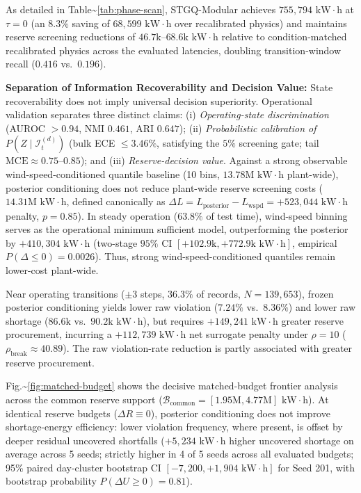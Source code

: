 \documentclass[
  journal]{IEEEtran}
\begin{document}
As detailed in Table\textasciitilde{}\ref{tab:phase-scan}, STGQ-Modular
achieves \(755{,}794\text{ kW}\cdot\text{h}\) at \(\tau=0\) (an
\(8.3\%\) saving of \(68{,}599\text{ kW}\cdot\text{h}\) over
recalibrated physics) and maintains reserve screening reductions of
\(46.7\text{k}\text{--}68.6\text{k}\text{ kW}\cdot\text{h}\) relative to
condition-matched recalibrated physics across the evaluated latencies,
doubling transition-window recall (\(0.416\) vs.~\(0.196\)).

\textbf{Separation of Information Recoverability and Decision Value:}
State recoverability does not imply universal decision superiority.
Operational validation separates three distinct claims: (i)
\textit{Operating-state discrimination} (AUROC \(> 0.94\), NMI
\(0.461\), ARI \(0.647\)); (ii)
\textit{Probabilistic calibration of $P(Z \mid \mathcal{I}_t^{(d)})$}
(bulk ECE \(\le 3.46\%\), satisfying the \(5\%\) screening gate; tail
\(\text{MCE} \approx 0.75\text{--}0.85\)); and (iii)
\textit{Reserve-decision value}. Against a strong observable
wind-speed-conditioned quantile baseline (10 bins,
\(13.78\text{M kW}\cdot\text{h}\) plant-wide), posterior conditioning
does not reduce plant-wide reserve screening costs
(\(14.31\text{M kW}\cdot\text{h}\), defined canonically as
\(\Delta L = L_{\text{posterior}} - L_{\text{wspd}} = +523{,}044\text{ kW}\cdot\text{h}\)
penalty, \(p=0.85\)). In steady operation (\(63.8\%\) of test time),
wind-speed binning serves as the operational minimum sufficient model,
outperforming the posterior by \(+410{,}304\text{ kW}\cdot\text{h}\)
(two-stage
\(95\%\text{ CI } [+102.9\text{k}, +772.9\text{k}\text{ kW}\cdot\text{h}]\),
empirical \(P(\Delta \le 0) = 0.0026\)). Thus, strong
wind-speed-conditioned quantiles remain lower-cost plant-wide.

Near operating transitions (\(\pm 3\) steps, \(36.3\%\) of records,
\(N=139{,}653\)), frozen posterior conditioning yields lower raw
violation (\(7.24\%\) vs.~\(8.36\%\)) and lower raw shortage
(\(86.6\text{k}\) vs.~\(90.2\text{k kW}\cdot\text{h}\)), but requires
\(+149{,}241\text{ kW}\cdot\text{h}\) greater reserve procurement,
incurring a \(+112{,}739\text{ kW}\cdot\text{h}\) net surrogate penalty
under \(\rho=10\) (\(\rho_{\text{break}} \approx 40.89\)). The raw
violation-rate reduction is partly associated with greater reserve
procurement.

Fig.\textasciitilde{}\ref{fig:matched-budget} shows the decisive
matched-budget frontier analysis across the common reserve support
(\(\mathcal{B}_{\text{common}} = [1.95\text{M}, 4.77\text{M}]\text{ kW}\cdot\text{h}\)).
At identical reserve budgets (\(\Delta R \equiv 0\)), posterior
conditioning does not improve shortage-energy efficiency: lower
violation frequency, where present, is offset by deeper residual
uncovered shortfalls (\(+5{,}234\text{ kW}\cdot\text{h}\) higher
uncovered shortage on average across 5 seeds; strictly higher in 4 of 5
seeds across all evaluated budgets; 95\% paired day-cluster bootstrap CI
\([-7{,}200, +1{,}904\text{ kW}\cdot\text{h}]\) for Seed 201, with
bootstrap probability \(P(\Delta U \ge 0) = 0.81\)).
\end{document}
